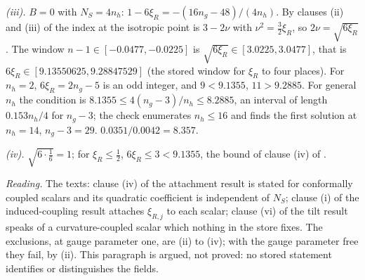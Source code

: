 \emph{(iii).} $B = 0$ with $N_{S} = 4n_{h}$: $1 - 6\xi_{R} = -(16n_{g} - 48)/(4n_{h})$. By clauses (ii) and (iii) of  the index at the isotropic point is $3 - 2\nu$ with $\nu^{2} = \tfrac32\xi_{R}$, so $2\nu = \sqrt{6\xi_{R}}$. The window $n - 1 \in [-0.0477, -0.0225]$ is $\sqrt{6\xi_{R}} \in [3.0225, 3.0477]$, that is $6\xi_{R} \in [9.13550625, 9.28847529]$ (the stored window for $\xi_{R}$ to four places). For $n_{h} = 2$, $6\xi_{R} = 2n_{g} - 5$ is an odd integer, and $9 < 9.1355$, $11 > 9.2885$. For general $n_{h}$ the condition is $8.1355 \le 4(n_{g} - 3)/n_{h} \le 8.2885$, an interval of length $0.153n_{h}/4$ for $n_{g} - 3$; the check enumerates $n_{h} \le 16$ and finds the first solution at $n_{h} = 14$, $n_{g} - 3 = 29$. $0.0351/0.0042 = 8.357$.

\emph{(iv).} $\sqrt{6\cdot\tfrac16} = 1$; for $\xi_{R} \le \tfrac12$, $6\xi_{R} \le 3 < 9.1355$, the bound of clause (iv) of .

\emph{Reading.} The texts: clause (iv) of the attachment result is stated for conformally coupled scalars and its quadratic coefficient is independent of $N_{S}$; clause (i) of the induced-coupling result attaches $\xi_{R,j}$ to each scalar; clause (vi) of the tilt result speaks of a curvature-coupled scalar which nothing in the store fixes. The exclusions, at gauge parameter one, are (ii) to (iv); with the gauge parameter free they fail, by (ii). This paragraph is argued, not proved: no stored statement identifies or distinguishes the fields.
